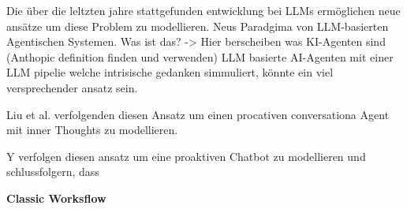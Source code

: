 Die über die leltzten jahre stattgefunden entwicklung bei LLMs ermöglichen neue ansätze um diese Problem zu modellieren.
Neus Paradgima von LLM-basierten Agentischen Systemen.
Was ist das? -> Hier berscheiben was KI-Agenten sind (Anthopic definition finden und verwenden)
LLM basierte AI-Agenten mit einer LLM pipelie welche intrisische gedanken simmuliert, könnte ein viel
versprechender ansatz sein.

Liu et al. verfolgenden diesen Ansatz um einen procativen conversationa Agent mit inner Thoughts zu
modellieren. \cite{liuProactiveConversationalAgents2025}

Y verfolgen diesen ansatz um eine proaktiven Chatbot zu modellieren und
schlussfolgern, dass

\textbf{Classic Worksflow}

